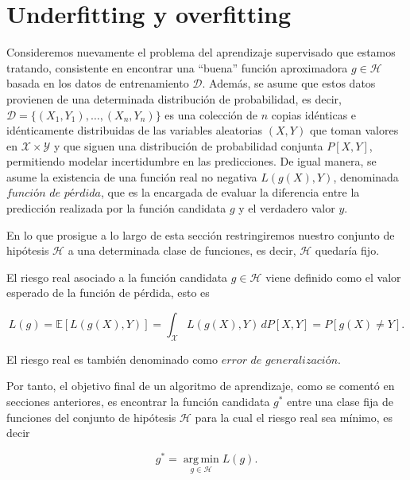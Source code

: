 \section{Underfitting y overfitting}\label{sec:subsec-underfitting-y-overfitting}

Consideremos nuevamente el problema del aprendizaje supervisado que estamos tratando, consistente en encontrar una ``buena'' función aproximadora $g \in \mathcal{H}$ basada en los datos de entrenamiento $\mathcal{D}$. Además, se asume que estos datos provienen de una determinada distribución de probabilidad, es decir, $\mathcal{D} = \{(X_{1}, Y_{1}), \ldots, (X_{n}, Y_{n})\}$ es una colección de $n$ copias idénticas e idénticamente distribuidas de las variables aleatorias $(X, Y)$ que toman valores en $\mathcal{X} \times \mathcal{Y}$ y que siguen una distribución de probabilidad conjunta $P[X, Y]$, permitiendo modelar incertidumbre en las predicciones. De igual manera, se asume la existencia de una función real no negativa $L(g(X), Y)$, denominada $\textit{función de pérdida}$, que es la encargada de evaluar la diferencia entre la predicción realizada por la función candidata $g$ y el verdadero valor $y$.\newline

En lo que prosigue a lo largo de esta sección restringiremos nuestro conjunto de hipótesis $\mathcal{H}$ a una determinada clase de funciones, es decir, $\mathcal{H}$ quedaría fijo.\newline

\begin{definicion}\label{def:riesgo-real}
    El riesgo real asociado a la función candidata $g \in \mathcal{H}$ viene definido como el valor esperado de la función de pérdida, esto es

    \[ L(g) = \mathbb{E}[L(g(X), Y)] = \int_{\mathcal{X}} L(g(X), Y) \, dP[X, Y] = P[g(X) \neq Y].\]

    El riesgo real es también denominado como $\textit{error de generalización}$.\newline
\end{definicion}

Por tanto, el objetivo final de un algoritmo de aprendizaje, como se comentó en secciones anteriores, es encontrar la función candidata $g^{*}$ entre una clase fija de funciones del conjunto de hipótesis $\mathcal{H}$ para la cual el riesgo real sea mínimo, es decir

\[ g^{*} = \operatorname*{\arg \,\min}_{g \in \mathcal{H}} L(g). \]\newline

